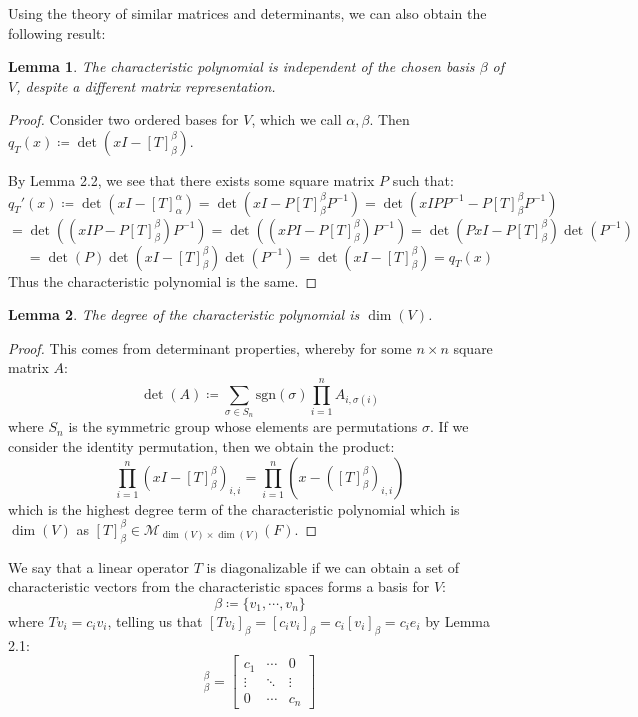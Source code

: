 \documentclass[10pt,letterpaper]{article} %
\newtheorem{lem}{Lemma}[section]
\begin{document}
Using the theory of similar matrices and determinants, we can also obtain the following result:
\begin{lem}
The characteristic polynomial is independent of the chosen basis $\beta$ of $V$, despite a different matrix representation.
\end{lem}
\begin{proof}
Consider two ordered bases for $V$, which we call $\alpha, \beta$. Then $q_T(x) \coloneq \det(xI - [T]_\beta^\beta)$.

By Lemma 2.2, we see that there exists some square matrix $P$ such that:
\begin{equation*}
q_T'(x) \coloneq \det(xI - [T]_\alpha^\alpha) = \det(xI - P[T]_\beta^\beta P^{-1}) = \det(xIPP^{-1} - P[T]_\beta^\beta P^{-1})
\end{equation*}
\begin{equation*}
= \det((xIP - P[T]_\beta^\beta)P^{-1}) = \det((xPI - P[T]_\beta^\beta)P^{-1}) = \det(PxI - P[T]_\beta^\beta)\det(P^{-1})
\end{equation*}
\begin{equation*}
= \det(P)\det(xI - [T]_\beta^\beta)\det(P^{-1}) = \det(xI - [T]_\beta^\beta) = q_T(x)
\end{equation*}
Thus the characteristic polynomial is the same.
\end{proof}

\begin{lem}
The degree of the characteristic polynomial is $\dim(V)$.
\end{lem}
\begin{proof}
This comes from determinant properties, whereby for some $n \times n$ square matrix $A$:
\begin{equation*}
\det(A) \coloneq \sum_{\sigma \in S_n}\text{sgn}(\sigma)\prod_{i=1}^{n}A_{i, \sigma(i)}
\end{equation*}
where $S_n$ is the symmetric group whose elements are permutations $\sigma$. If we consider the identity permutation, then we obtain the product:
\begin{equation*}
\prod_{i=1}^n(xI - [T]_{\beta}^\beta)_{i, i} = \prod_{i=1}^n(x - ([T]_{\beta}^{\beta})_{i, i})
\end{equation*}
which is the highest degree term of the characteristic polynomial which is $\dim(V)$ as $[T]_\beta^\beta \in \mathcal{M}_{\dim(V) \times \dim(V)}(F)$.
\end{proof}

We say that a linear operator $T$ is diagonalizable if we can obtain a set of characteristic vectors from the characteristic spaces forms a basis for $V$:
\begin{equation*}
\beta \coloneq \{v_1, \cdots, v_n\}
\end{equation*}
where $Tv_i = c_iv_i$, telling us that $[Tv_i]_\beta = [c_iv_i]_\beta = c_i[v_i]_\beta = c_ie_i$ by Lemma 2.1:
\begin{equation*}
[T]_\beta^\beta = \begin{bmatrix}
c_1 & \cdots & 0\\
\vdots & \ddots & \vdots\\
0 & \cdots & c_n
\end{bmatrix}
\end{equation*}
\end{document}
